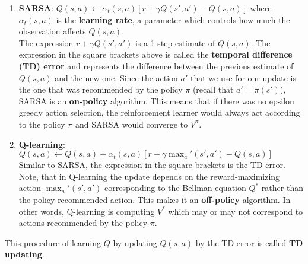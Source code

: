 \begin{enumerate}
    \item \textbf{SARSA}: $Q(s, a) \leftarrow \alpha_t(s, a)[r + \gamma Q(s', a') - Q(s, a)]$ where $\alpha_t(s, a)$ is the \textbf{learning rate}, a parameter which controls how much the observation affects $Q(s, a)$.\\
    The expression $r + \gamma Q(s', a')$ is a 1-step estimate of $Q(s, a)$. The expression in the square brackets above is called the \textbf{temporal difference (TD) error} and represents the difference between the previous estimate of $Q(s, a)$ and the new one. Since the action $a'$ that we use for our update is the one that was recommended by the policy $\pi$ (recall that $a' = \pi(s')$), SARSA is an \textbf{on-policy} algorithm. This means that if there was no epsilon greedy action selection, the reinforcement learner would always act according to the policy $\pi$ and SARSA would converge to $V^{\pi}$.
    \item \textbf{Q-learning}: $Q(s, a) \leftarrow Q(s, a) + \alpha_t(s, a)[r + \gamma\max_a'(s', a') - Q(s, a)]$\\
    Similar to SARSA, the expression in the square brackets is the TD error. Note, that in Q-learning the update depends on the reward-maximizing action $\max_a'(s', a')$ corresponding to the Bellman equation $Q^*$ rather than the policy-recommended action. This makes it an \textbf{off-policy} algorithm. In other words, Q-learning is computing $V^{*}$ which may or may not correspond to actions recommended by the policy $\pi$.
\end{enumerate}
This procedure of learning $Q$ by updating $Q(s, a)$ by the TD error is called \textbf{TD updating}.
